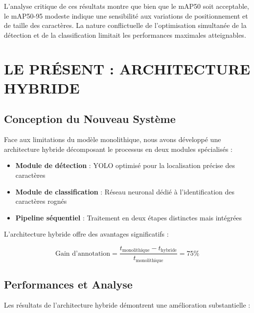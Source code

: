 \documentclass[letterpaper, 10 pt, conference]{ieeeconf}  %
\begin{document}
L'analyse critique de ces résultats montre que bien que le mAP50 soit acceptable, le mAP50-95 modeste indique une sensibilité aux variations de positionnement et de taille des caractères. La nature conflictuelle de l'optimisation simultanée de la détection et de la classification limitait les performances maximales atteignables.

\section{LE PRÉSENT : ARCHITECTURE HYBRIDE}

\subsection{Conception du Nouveau Système}

Face aux limitations du modèle monolithique, nous avons développé une architecture hybride décomposant le processus en deux modules spécialisés :

\begin{itemize}
\item \textbf{Module de détection} : YOLO optimisé pour la localisation précise des caractères
\item \textbf{Module de classification} : Réseau neuronal dédié à l'identification des caractères rognés
\item \textbf{Pipeline séquentiel} : Traitement en deux étapes distinctes mais intégrées
\end{itemize}

L'architecture hybride offre des avantages significatifs :

\begin{equation}
\text{Gain d'annotation} = \frac{t_{\text{monolithique}} - t_{\text{hybride}}}{t_{\text{monolithique}}} = 75\%
\end{equation}

\subsection{Performances et Analyse}

Les résultats de l'architecture hybride démontrent une amélioration substantielle :
\end{document}

